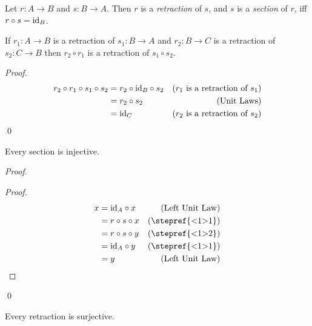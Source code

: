 \begin{df}
  Let $r : A \rightarrow B$ and $s : B \rightarrow A$. Then $r$ is a
  \emph{retraction} of $s$, and $s$ is a \emph{section} of $r$, iff $r \circ
  s = \mathrm{id}_{B}$.
\end{df}

\begin{prop}
\label{prop:sets:retraction:comp}
If $r_1 : A \rightarrow B$ is a retraction of $s_1 : B \rightarrow A$ and $r_2 : B \rightarrow C$ is a retraction of $s_2 : C \rightarrow B$ then $r_2 \circ r_1$ is a retraction of $s_1 \circ s_2$.
\end{prop}

\begin{proof}
\pf
\begin{align*}
r_2 \circ r_1 \circ s_1 \circ s_2 & = r_2 \circ \mathrm{id}_{B} \circ s_2 & (\text{$r_1$ is a retraction of $s_1$}) \\
& = r_2 \circ s_2 & (\text{Unit Laws}) \\
& = \mathrm{id}_{C} & (\text{$r_2$ is a retraction of $s_2$})
\end{align*}
\qed
\end{proof}

\begin{prop}
\label{prop:sets:section:injective}
Every section is injective.
\end{prop}

\begin{proof}
  \pf
  \begin{proof}
    \pf
    \begin{align*}
      x & = \id{A} \circ x & (\text{Left Unit Law}) \\
      & = r \circ s \circ x & (\text{\stepref{<1>1}}) \\
      & = r \circ s \circ y & (\text{\stepref{<1>2}}) \\
      & = \id{A} \circ y & (\text{\stepref{<1>1}}) \\
      & = y & (\text{Left Unit Law})
    \end{align*}
  \end{proof}
  \qed
\end{proof}

\begin{prop}
  \label{prop:sets:retraction:surjective}
  Every retraction is surjective.
\end{prop}

